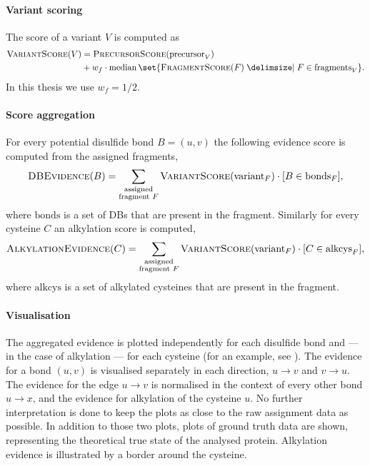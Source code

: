 \paragraph{Variant scoring} The score of a variant \(V\) is computed as \begin{align*}
  \textsc{VariantScore}(V) & = \textsc{PrecursorScore}(\mathrm{precursor}_V)                                                        \\
                           & + w_f \cdot \operatorname{median} \set{ \textsc{FragmentScore}(F) \given F \in \mathrm{fragments}_V }.
\end{align*} In this thesis we use \(w_f = 1/2\).

\paragraph{Score aggregation} For every potential disulfide bond \(B = (u, v)\) the following evidence score is computed  from the assigned fragments, \[\textsc{DBEvidence}(B) = \sum_{\substack{ \text{assigned} \\ \text{fragment } F }} \textsc{VariantScore}(\mathrm{variant}_F) \cdot [B \in \mathrm{bonds}_F], \] where \(\mathrm{bonds}\) is a set of DBs that are present in the fragment. Similarly for every cysteine \(C\) an alkylation score is computed, \[\textsc{AlkylationEvidence}(C) = \sum_{\substack{ \text{assigned} \\ \text{fragment } F }} \textsc{VariantScore}(\mathrm{variant}_F) \cdot [C \in \mathrm{alkcys}_F],\] where \(\mathrm{alkcys}\) is a set of alkylated cysteines that are present in the fragment.

\paragraph{Visualisation} The aggregated evidence is plotted independently for each disulfide bond and --- in the case of alkylation --- for each cysteine (for an example, see ). The evidence for a bond \((u, v)\) is visualised separately in each direction, \(u \to v\) and \(v \to u\). The evidence for the edge \(u \to v\) is normalised in the context of every other bond \(u \to x\), and the evidence for alkylation of the cysteine \(u\). No further interpretation is done to keep the plots as close to the raw assignment data as possible. In addition to those two plots, plots of ground truth data are shown, representing the theoretical true state of the analysed protein. Alkylation evidence is illustrated by a border around the cysteine.

